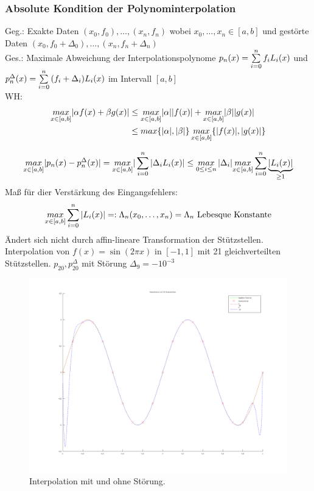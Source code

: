 \subsubsection{Absolute Kondition der Polynominterpolation}
Geg.: Exakte Daten $(x_0, f_0), \ldots, (x_n, f_n)$ wobei $x_0, \ldots, x_n \in [a, b]$ und
gestörte Daten $(x_0, f_0 + \Delta_0), \ldots, (x_n, f_n + \Delta_n)$ \\
Ges.: Maximale Abweichung der Interpolationspolynome $p_n(x) = \sum\limits_{i=0}^{n}{f_i L_i(x)}$ und
$p^{\Delta}_n(x) = \sum\limits_{i=0}^{n}{(f_i + \Delta_i) L_i(x)}$ im Intervall $[a, b]$ \\
WH:
\begin{align*}
  \underset{x \in [a, b]}{max} |\alpha f(x) + \beta g(x)| &\leq
    \underset{x \in [a, b]}{max} |\alpha| |f(x)| + \underset{x \in [a, b]}{max} |\beta| |g(x)| \\
  &\leq max\{|\alpha|, |\beta|\}\, \underset{x \in [a, b]}{max}\{|f(x)|, |g(x)|\}
\end{align*}

\begin{align*}
  \underset{x \in [a, b]}{max} |p_n(x) - p^{\Delta}_n(x)| = \underset{x \in [a, b]}{max} | \sum\limits_{i=0}^{n}{|\Delta_i L_i(x)} | \leq
  \underset{0 \leq i \leq n}{max}\,|\Delta_i| \underset{x \in [a, b]}{max} \sum\limits_{i=0}^{n}{\underbrace{|L_i(x)|}_{\geq 1}}
\end{align*}
Maß für dier Verstärkung des Eingangsfehlers:
\begin{equation*}
  \underset{x \in [a, b]}{max} \sum\limits_{i=0}^{n}{|L_i(x)|} =: \Lambda_n(x_0, \dots, x_n) = \Lambda_n 
  \text{ Lebesque Konstante}
\end{equation*}
Ändert sich nicht durch affin-lineare Transformation der Stützstellen.
 Interpolation von $f(x) =\sin(2\pi x)$ in $[-1, 1]$ mit 21
gleichverteilten Stützstellen. $p_{20}, p_{20}^\Delta$ mit Störung $\Delta_9 = -10^{-3}$
\begin{figure}[htbp]
  \centering
  \includegraphics[width=\textwidth]{figures/interpolation_stoerung.png}
  \caption{Interpolation mit und ohne Störung.}
  \label{fig:interpolation-stoerung}
\end{figure}

